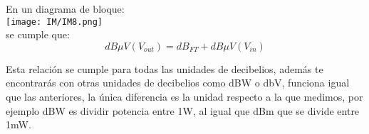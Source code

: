 \documentclass[
	12pt, %
	fleqn, %
	a4paper, %
	oneside, %
]{LegrandOrangeBook}
\begin{document}
\begin{definition}\label{def:db ft}
En un diagrama de bloque:\\
\texttt{[image: IM/IM8.png]}\\
se cumple que:
\begin{equation}
\label{eq:db de ft}
dB\mu V(V_{out})=dB_{FT}+dB\mu V(V_{in})
\end{equation}
\end{definition}
\begin{remark}
Esta relación se cumple para todas las unidades de decibelios, además te encontrarás con otras unidades de decibelios como dBW o dbV, funciona igual que las anteriores, la única diferencia es la unidad respecto a la que medimos, por ejemplo dBW es dividir potencia entre 1W, al igual que dBm que se divide entre 1mW.
\end{remark}
\end{document}
